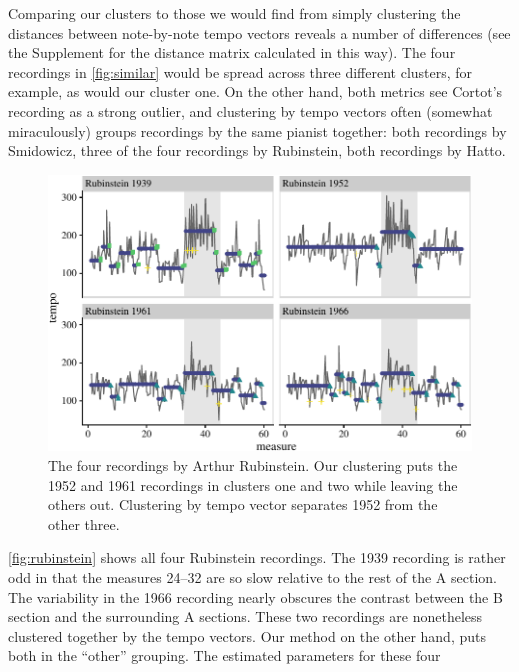 \documentclass[aoas]{imsart}
\begin{document}
Comparing our clusters to those we would find from simply clustering
the distances between note-by-note tempo vectors reveals a number of
differences (see the Supplement for the distance matrix calculated in
this way). The four recordings in \autoref{fig:similar} would be
spread across three different clusters, for example, as would our
cluster one. On the other hand, both metrics see Cortot's recording as a
strong outlier, and clustering by tempo vectors often (somewhat
miraculously) groups recordings by the same pianist together: both
recordings by Smidowicz, three of the four recordings by Rubinstein,
both recordings by Hatto.
\begin{figure}[t]
  \centering
  \includegraphics[width=.9\linewidth]{rubinstein-perfs-1}
  \caption{The four recordings by Arthur Rubinstein. Our clustering
    puts the 1952 and 1961 recordings in clusters one and two while
    leaving the others out. Clustering by tempo vector separates 1952
    from the other three.}
  \label{fig:rubinstein}
\end{figure}
\autoref{fig:rubinstein} shows all four Rubinstein recordings. The
1939 recording is rather odd in that the measures 24--32 are so slow
relative to the rest of the A section. The variability in the 1966
recording nearly obscures the contrast between the B section and the
surrounding A sections. These two recordings are nonetheless clustered
together by the tempo vectors. Our method on the other hand, puts both
in the ``other'' grouping. The estimated parameters for these four
\end{document}
